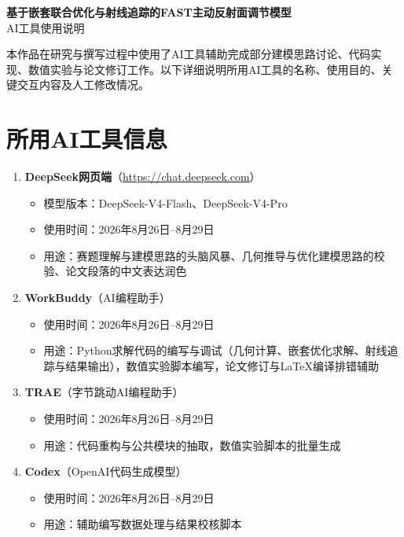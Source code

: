 \documentclass[12pt,a4paper]{article}
\begin{document}
\begin{center}
    {\LARGE\bfseries 基于嵌套联合优化与射线追踪的FAST主动反射面调节模型}\\[1em]
    {\large AI工具使用说明}
\end{center}

\vspace{1em}

本作品在研究与撰写过程中使用了AI工具辅助完成部分建模思路讨论、代码实现、数值实验与论文修订工作。以下详细说明所用AI工具的名称、使用目的、关键交互内容及人工修改情况。

\section{所用AI工具信息}

\begin{enumerate}
    \item \textbf{DeepSeek网页端}（\url{https://chat.deepseek.com}）
    \begin{itemize}
        \item 模型版本：DeepSeek-V4-Flash、DeepSeek-V4-Pro
        \item 使用时间：2026年8月26日--8月29日
        \item 用途：赛题理解与建模思路的头脑风暴、几何推导与优化建模思路的校验、论文段落的中文表达润色
    \end{itemize}

    \item \textbf{WorkBuddy}（AI编程助手）
    \begin{itemize}
        \item 使用时间：2026年8月26日--8月29日
        \item 用途：Python求解代码的编写与调试（几何计算、嵌套优化求解、射线追踪与结果输出），数值实验脚本编写，论文修订与LaTeX编译排错辅助
    \end{itemize}

    \item \textbf{TRAE}（字节跳动AI编程助手）
    \begin{itemize}
        \item 使用时间：2026年8月26日--8月29日
        \item 用途：代码重构与公共模块的抽取，数值实验脚本的批量生成
    \end{itemize}

    \item \textbf{Codex}（OpenAI代码生成模型）
    \begin{itemize}
        \item 使用时间：2026年8月26日--8月29日
        \item 用途：辅助编写数据处理与结果校核脚本
    \end{itemize}
\end{enumerate}
\end{document}
